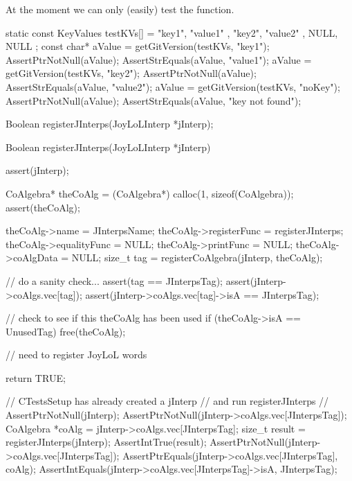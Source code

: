 At the moment we can only (easily) test the  function.

\startCTest
  static const KeyValues testKVs[] = {
    { "key1", "value1" },
    { "key2", "value2" },
    { NULL,   NULL }
  };
  const char* aValue = getGitVersion(testKVs, "key1");
  AssertPtrNotNull(aValue);
  AssertStrEquals(aValue, "value1");
  aValue = getGitVersion(testKVs, "key2");
  AssertPtrNotNull(aValue);
  AssertStrEquals(aValue, "value2");
  aValue = getGitVersion(testKVs, "noKey");
  AssertPtrNotNull(aValue);
  AssertStrEquals(aValue, "key not found");
\stopCTest
\stopTestCase
\stopTestSuite

\startTestSuite[regiserJInterps]

\startCHeader
Boolean registerJInterps(JoyLoLInterp *jInterp);
\stopCHeader
{}

\startCCode
Boolean registerJInterps(JoyLoLInterp *jInterp) {
  assert(jInterp);
  
  CoAlgebra* theCoAlg    = (CoAlgebra*) calloc(1, sizeof(CoAlgebra));
  assert(theCoAlg);
  
  theCoAlg->name         = JInterpsName;
  theCoAlg->registerFunc = registerJInterps;
  theCoAlg->equalityFunc = NULL;
  theCoAlg->printFunc    = NULL;
  theCoAlg->coAlgData    = NULL;
  size_t tag = registerCoAlgebra(jInterp, theCoAlg);
  
  // do a sanity check...
  assert(tag == JInterpsTag);
  assert(jInterp->coAlgs.vec[tag]);
  assert(jInterp->coAlgs.vec[tag]->isA == JInterpsTag);
  
  // check to see if this theCoAlg has been used
  if (theCoAlg->isA == UnusedTag) {
    free(theCoAlg);
  }
  
  // need to register JoyLoL words
  
  return TRUE;
}
\stopCCode


\startCTest
  // CTestsSetup has already created a jInterp 
  // and run registerJInterps
  //
  AssertPtrNotNull(jInterp);
  AssertPtrNotNull(jInterp->coAlgs.vec[JInterpsTag]);
  CoAlgebra *coAlg = jInterp->coAlgs.vec[JInterpsTag];
  size_t result = registerJInterps(jInterp);
  AssertIntTrue(result);
  AssertPtrNotNull(jInterp->coAlgs.vec[JInterpsTag]);
  AssertPtrEquals(jInterp->coAlgs.vec[JInterpsTag], coAlg);
  AssertIntEquals(jInterp->coAlgs.vec[JInterpsTag]->isA, JInterpsTag);
\stopCTest
\stopTestCase
\stopTestSuite
